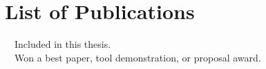 \chapter*{List of Publications}
\label{publications}

\begin{etaremune}{\small
}\end{etaremune}

\vspace{0.5cm}
\noindent
\faFileTextO~~Included in this thesis.\\
\faTrophy~~Won a best paper, tool demonstration, or proposal award.
